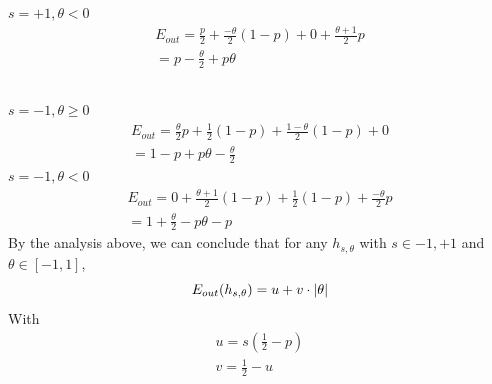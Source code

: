 \documentclass[11pt]{article}
\theoremstyle{definition}
\begin{document}
\subsection*{}
$s = +1, \theta < 0$ \\ 
\begin{gather*}
  E_{out} = \frac{p}{2} + \frac{-\theta}{2}(1 - p) + 0 + \frac{\theta + 1}{2}p \\ 
  = p - \frac{\theta}{2} + p\theta
\end{gather*}
\subsection*{}
$s = -1, \theta\geq0$\\
\begin{gather*}
  E_{out} = \frac{\theta}{2}p + \frac{1}{2}(1 - p) + \frac{1 - \theta}{2}(1 - p) + 0 \\ 
  = 1 - p + p\theta - \frac{\theta}{2}
\end{gather*}
$s = -1, \theta<0$\\
\begin{gather*}
  E_{out} = 0 + \frac{\theta + 1}{2}(1 - p) + \frac{1}{2}(1 - p) + \frac{-\theta}{2}p \\ 
  = 1 + \frac{\theta}{2} - p\theta - p
\end{gather*}
By the analysis above, we can conclude that for any $h_{s, \theta}$ with $s \in {-1, +1}$ and $\theta \in [-1, 1]$, 
\[
  E_{out}(h_{s, \theta}) = u + v\cdot\abs{\theta}
\]
With 
\begin{gather*}
  u = s(\frac{1}{2} - p) \\ 
  v = \frac{1}{2} - u
\end{gather*}
\newpage
\end{document}
